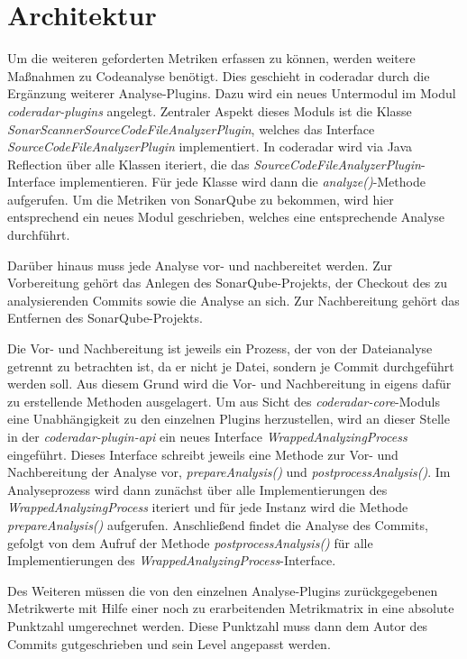 \documentclass[
	oneside,  %
	ngerman, 
	final, 
	11pt, 
	a4paper, 
	1.1headlines, 
	headinclude=false, 
	footinclude=false, 
	mpinclude=false, 
	pagesize, 
	onecolumn, 
	titlepage, 
	parskip=half, 
	headsepline, 
	chapterprefix=false, 
	version=first, 
	listof=totoc, 
	bibliography=totoc, 
	toc=graduated, 
	fleqn
]{scrbook}
\begin{document}
\section{Architektur}
\label{Architektur}
Um die weiteren geforderten Metriken erfassen zu können, werden weitere Maßnahmen zu Codeanalyse benötigt.
Dies geschieht in coderadar durch die Ergänzung weiterer Analyse-Plugins.
Dazu wird ein neues Untermodul im Modul \textit{coderadar-plugins} angelegt.
Zentraler Aspekt dieses Moduls ist die Klasse \textit{SonarScannerSourceCodeFileAnalyzerPlugin}, welches das Interface \textit{SourceCodeFileAnalyzerPlugin} implementiert.
In coderadar wird via Java Reflection über alle Klassen iteriert, die das \textit{SourceCodeFileAnalyzerPlugin}-Interface implementieren.
Für jede Klasse wird dann die \textit{analyze()}-Methode aufgerufen.
Um die Metriken von SonarQube zu bekommen, wird hier entsprechend ein neues Modul geschrieben, welches eine entsprechende Analyse durchführt.

Darüber hinaus muss jede Analyse vor- und nachbereitet werden.
Zur Vorbereitung gehört das Anlegen des SonarQube-Projekts, der Checkout des zu analysierenden Commits sowie die Analyse an sich.
Zur Nachbereitung gehört das Entfernen des SonarQube-Projekts.

Die Vor- und Nachbereitung ist jeweils ein Prozess, der von der Dateianalyse getrennt zu betrachten ist, da er nicht je Datei, sondern je Commit durchgeführt werden soll.
Aus diesem Grund wird die Vor- und Nachbereitung in eigens dafür zu erstellende Methoden ausgelagert.
Um aus Sicht des \textit{coderadar-core}-Moduls eine Unabhängigkeit zu den einzelnen Plugins herzustellen, wird an dieser Stelle in der \textit{coderadar-plugin-api} ein neues Interface \textit{WrappedAnalyzingProcess} eingeführt.
Dieses Interface schreibt jeweils eine Methode zur Vor- und Nachbereitung der Analyse vor, \textit{prepareAnalysis()} und \textit{postprocessAnalysis()}.
Im Analyseprozess wird dann zunächst über alle Implementierungen des \textit{WrappedAnalyzingProcess} iteriert und für jede Instanz wird die Methode \textit{prepareAnalysis()} aufgerufen.
Anschließend findet die Analyse des Commits, gefolgt von dem Aufruf der Methode \textit{postprocessAnalysis()} für alle Implementierungen des \textit{WrappedAnalyzingProcess}-Interface.

Des Weiteren müssen die von den einzelnen Analyse-Plugins zurückgegebenen Metrikwerte mit Hilfe einer noch zu erarbeitenden Metrikmatrix in eine absolute Punktzahl umgerechnet werden.
Diese Punktzahl muss dann dem Autor des Commits gutgeschrieben und sein Level angepasst werden.
\end{document}
